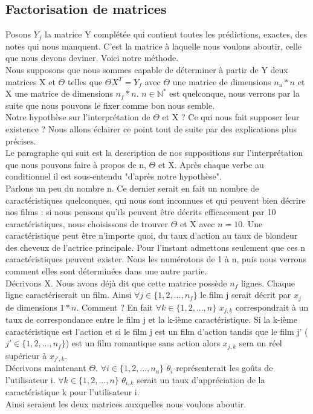 \documentclass[a4paper,10pt]{article}
\begin{document}
\subsection{Factorisation de matrices}

Posons $Y_f$ la matrice Y complétée qui contient toutes les prédictions, exactes, des notes qui nous manquent. C'est la matrice à laquelle nous voulons aboutir, celle que nous devons deviner. Voici notre méthode.\\ 
 
Nous supposons que nous sommes capable de déterminer à partir de Y deux matrices X et $\Theta$ telles que $\Theta X^T = Y_f$ avec $\Theta$ une matrice de dimensions $n_u * n$ et X une matrice de dimensions $n_f * n$. $n \in \mathbb{N}^*$ est quelconque, nous verrons par la suite que nous pouvons le fixer comme bon nous semble.\\ 
Notre hypothèse sur l'interprétation de $\Theta$ et X ? Ce qui nous fait supposer leur existence ? Nous allons éclairer ce point tout de suite par des explications plus précises.\\

Le paragraphe qui suit est la description de nos suppositions sur l'interprétation que nous pouvons faire à propos de n, $\Theta$ et X. Après chaque verbe au conditionnel il est sous-entendu "d'après notre hypothèse".\\
Parlons un peu du nombre n. Ce dernier serait en fait un nombre de caractéristiques quelconques, qui nous sont inconnues et qui peuvent bien décrire nos films : si nous pensons qu'ils peuvent être décrits efficacement par 10 caractéristiques, nous choisissons de trouver $\Theta$ et X avec $n = 10$. 
Une caractéristique peut être n'importe quoi, du taux d'action au taux de blondeur des cheveux de l'actrice principale. Pour l'instant admettons seulement que ces n caractéristiques peuvent exister. Nous les numérotons de 1 à n, puis nous verrons comment elles sont déterminées dans une autre partie.\\
Décrivons X. Nous avons déjà dit que cette matrice possède $n_f$ lignes. Chaque ligne caractériserait un film. Ainsi $\forall j \in \{1, 2, ..., n_f\}$ le film j serait décrit par $x_j$ de dimensions $1 * n$. Comment ? En fait $\forall k \in \{1, 2, ..., n\}$ $x_{j,k}$ correspondrait à un taux de correspondance entre le film j et la k-ième caractéristique. Si la k-ième caractéristique est l'action et si le film j est un film d'action tandis que le film j' ($j' \in \{1, 2, ..., n_f\}$) est un film romantique sans action alors $x_{j,k}$ sera un réel supérieur à $x_{j',k}$.\\
Décrivons maintenant $\Theta$. $\forall i \in \{1, 2, ..., n_u\}$ $\theta_{i}$ représenterait les goûts de l'utilisateur i. $\forall k \in \{1, 2, ..., n\}$ $\theta_{i,k}$ serait un taux d'appréciation de la caractéristique k pour l'utilisateur i.\\
Ainsi seraient les deux matrices auxquelles nous voulons aboutir.\\
\end{document}
